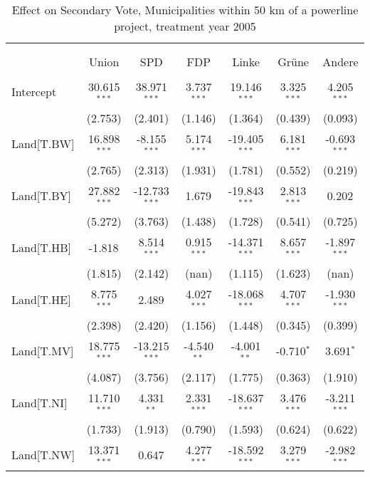 \begin{table}[!htbp] \centering
  \caption{Effect on Secondary Vote, Municipalities within 50 km of a powerline project, treatment year 2005}
\begin{tabular}{@{\extracolsep{5pt}}lcccccc}
\\[-1.8ex]\hline
\hline \\[-1.8ex]
\\[-1.8ex] & \multicolumn{1}{c}{Union} & \multicolumn{1}{c}{SPD} & \multicolumn{1}{c}{FDP} & \multicolumn{1}{c}{Linke} & \multicolumn{1}{c}{Grüne} & \multicolumn{1}{c}{Andere}  \\
\hline \\[-1.8ex]
 Intercept & 30.615$^{***}$ & 38.971$^{***}$ & 3.737$^{***}$ & 19.146$^{***}$ & 3.325$^{***}$ & 4.205$^{***}$ \\
  & (2.753) & (2.401) & (1.146) & (1.364) & (0.439) & (0.093) \\
 Land[T.BW] & 16.898$^{***}$ & -8.155$^{***}$ & 5.174$^{***}$ & -19.405$^{***}$ & 6.181$^{***}$ & -0.693$^{***}$ \\
  & (2.765) & (2.313) & (1.931) & (1.781) & (0.552) & (0.219) \\
 Land[T.BY] & 27.882$^{***}$ & -12.733$^{***}$ & 1.679$^{}$ & -19.843$^{***}$ & 2.813$^{***}$ & 0.202$^{}$ \\
  & (5.272) & (3.763) & (1.438) & (1.728) & (0.541) & (0.725) \\
 Land[T.HB] & -1.818$^{}$ & 8.514$^{***}$ & 0.915$^{***}$ & -14.371$^{***}$ & 8.657$^{***}$ & -1.897$^{***}$ \\
  & (1.815) & (2.142) & (nan) & (1.115) & (1.623) & (nan) \\
 Land[T.HE] & 8.775$^{***}$ & 2.489$^{}$ & 4.027$^{***}$ & -18.068$^{***}$ & 4.707$^{***}$ & -1.930$^{***}$ \\
  & (2.398) & (2.420) & (1.156) & (1.448) & (0.345) & (0.399) \\
 Land[T.MV] & 18.775$^{***}$ & -13.215$^{***}$ & -4.540$^{**}$ & -4.001$^{**}$ & -0.710$^{*}$ & 3.691$^{*}$ \\
  & (4.087) & (3.756) & (2.117) & (1.775) & (0.363) & (1.910) \\
 Land[T.NI] & 11.710$^{***}$ & 4.331$^{**}$ & 2.331$^{***}$ & -18.637$^{***}$ & 3.476$^{***}$ & -3.211$^{***}$ \\
  & (1.733) & (1.913) & (0.790) & (1.593) & (0.624) & (0.622) \\
 Land[T.NW] & 13.371$^{***}$ & 0.647$^{}$ & 4.277$^{***}$ & -18.592$^{***}$ & 3.279$^{***}$ & -2.982$^{***}$ \\

\end{tabular}
\end{table}
